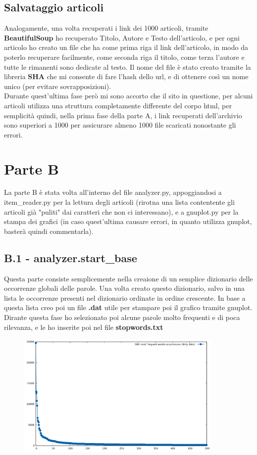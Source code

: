 \documentclass{article}
\begin{document}
\subsection{Salvataggio articoli}Analogamente, una volta recuperati i link dei 1000 articoli, tramite \textbf{BeautifulSoup} ho recuperato Titolo, Autore e Testo dell'articolo, e per ogni articolo ho creato un file che ha come prima riga il link dell'articolo, in modo da poterlo recuperare facilmente, come seconda riga il titolo, come terza l'autore e tutte le rimanenti sono dedicate al testo. Il nome del file è stato creato tramite la libreria \textbf{SHA} che mi consente di fare l'hash dello url, e di ottenere così un nome unico (per evitare sovrapposizioni).\\Durante quest'ultima fase però mi sono accorto che il sito in questione, per alcuni articoli utilizza una struttura completamente differente del corpo html, per semplicità quindi, nella prima fase della parte A, i link recuperati dell'archivio sono superiori a 1000 per assicurare almeno 1000 file scaricati nonostante gli errori.
\section{Parte B}
La parte B è stata volta all'interno del file analyzer.py, appoggiandosi a item\_reader.py per la lettura degli articoli (rirotna una lista contentente gli articoli già "puliti" dai caratteri che non ci interessano), e a gnuplot.py per la stampa dei grafici (in caso quest'ultima causare errori, in quanto utilizza gnuplot, basterà quindi commentarla).
\subsection{B.1 - analyzer.start\_base}
Questa parte consiste semplicemente nella creaione di un semplice dizionario delle occorrenze globali delle parole.
Una volta creato questo dizionario, salvo in una lista le occorrenze presenti nel dizionario ordinate in ordine crescente.
In base a questa lista creo poi un file \textbf{.dat} utile per stampare poi il grafico tramite gnuplot.
Dirante questa fase ho selezionato poi alcune parole molto frequenti e di poca rilevanza, e le ho inserite poi nel file \textbf{stopwords.txt}
\begin{figure}[h]
	\includegraphics[width=10cm]{plotted_dirty.png}
	\centering
\end{figure}
\end{document}
